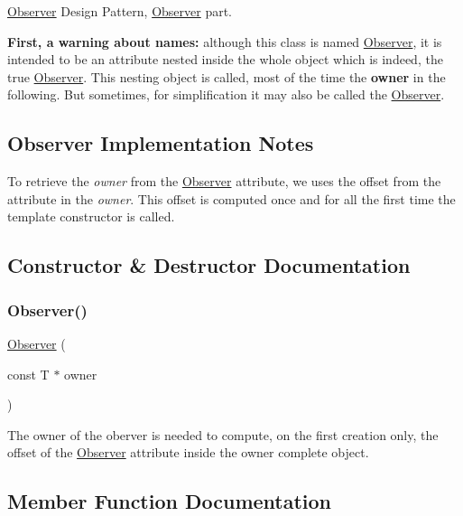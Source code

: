 \hyperlink{classKatabatic_1_1Observer}{Observer} Design Pattern, \hyperlink{classKatabatic_1_1Observer}{Observer} part. 

{\bfseries First, a warning about names\+:} although this class is named \hyperlink{classKatabatic_1_1Observer}{Observer}, it is intended to be an attribute nested inside the whole object which is indeed, the true \hyperlink{classKatabatic_1_1Observer}{Observer}. This nesting object is called, most of the time the {\bfseries owner} in the following. But sometimes, for simplification it may also be called the \hyperlink{classKatabatic_1_1Observer}{Observer}.\hypertarget{classKatabatic_1_1Observer_secImplObserver}{}\subsection{Observer Implementation Notes}\label{classKatabatic_1_1Observer_secImplObserver}
To retrieve the {\itshape owner} from the \hyperlink{classKatabatic_1_1Observer}{Observer} attribute, we uses the offset from the attribute in the {\itshape owner}. This offset is computed once and for all the first time the template constructor is called. 

\subsection{Constructor \& Destructor Documentation}
\mbox{\label{classKatabatic_1_1Observer_ab05ec12517c51952960dd4f324499b44}} 
\subsubsection{\texorpdfstring{Observer()}{Observer()}}
{\footnotesize\ttfamily \hyperlink{classKatabatic_1_1Observer}{Observer} (\begin{DoxyParamCaption}\item[{const T $\ast$}]{owner }\end{DoxyParamCaption})\hspace{0.3cm}{\ttfamily [inline]}}

The owner of the oberver is needed to compute, on the first creation only, the offset of the \hyperlink{classKatabatic_1_1Observer}{Observer} attribute inside the {\ttfamily owner} complete object. 

\subsection{Member Function Documentation}
\mbox{\label{classKatabatic_1_1Observer_ac29b8f99d632058c95784fd7233b8474}} 

